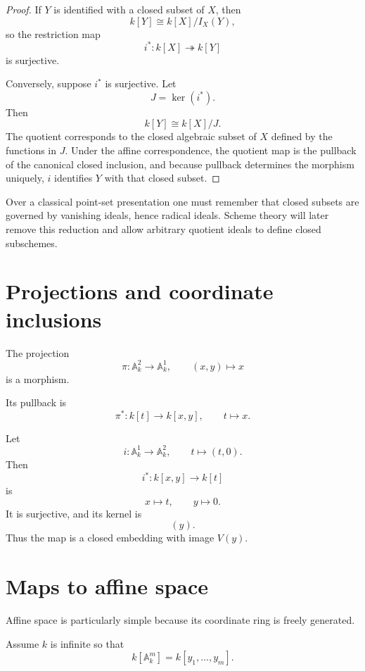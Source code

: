 \begin{proof}
If \(Y\) is identified with a closed subset of \(X\), then
\[
k[Y]\cong k[X]/I_X(Y),
\]
so the restriction map
\[
i^\ast:k[X]\twoheadrightarrow k[Y]
\]
is surjective.

Conversely, suppose \(i^\ast\) is surjective.  Let
\[
J=\ker(i^\ast).
\]
Then
\[
k[Y]\cong k[X]/J.
\]
The quotient corresponds to the closed algebraic subset of \(X\) defined by the functions in
\(J\).  Under the affine correspondence, the quotient map is the pullback of the canonical
closed inclusion, and because pullback determines the morphism uniquely, \(i\) identifies
\(Y\) with that closed subset.
\end{proof}

\begin{remark}
Over a classical point-set presentation one must remember that closed subsets are governed
by vanishing ideals, hence radical ideals.  Scheme theory will later remove this reduction
and allow arbitrary quotient ideals to define closed subschemes.
\end{remark}

\section{Projections and coordinate inclusions}

\begin{example}[Projection]
The projection
\[
\pi:\mathbb A_k^2\to\mathbb A_k^1,
\qquad
(x,y)\mapsto x
\]
is a morphism.

Its pullback is
\[
\pi^\ast:k[t]\to k[x,y],
\qquad
t\mapsto x.
\]
\end{example}

\begin{example}
Let
\[
i:\mathbb A_k^1\to\mathbb A_k^2,
\qquad
t\mapsto(t,0).
\]
Then
\[
i^\ast:k[x,y]\to k[t]
\]
is
\[
x\mapsto t,
\qquad
y\mapsto0.
\]
It is surjective, and its kernel is
\[
(y).
\]
Thus the map is a closed embedding with image \(V(y)\).
\end{example}

\section{Maps to affine space}

Affine space is particularly simple because its coordinate ring is freely generated.

Assume \(k\) is infinite so that
\[
k[\mathbb A_k^m]=k[y_1,\dots,y_m].
\]

